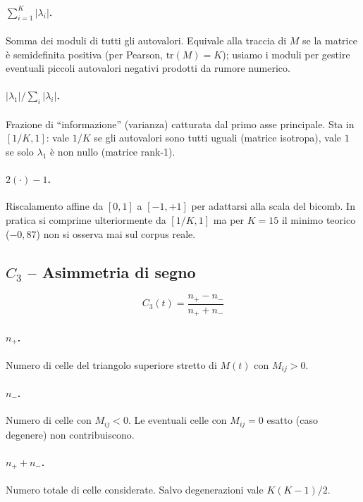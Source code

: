 \documentclass[a4paper,11pt]{article}
\begin{document}
\paragraph{$\sum_{i=1}^{K} |\lambda_i|$.} Somma dei moduli di tutti gli
autovalori. Equivale alla traccia di $M$ se la matrice è
semidefinita positiva (per Pearson, $\mathrm{tr}(M) = K$); usiamo i
moduli per gestire eventuali piccoli autovalori negativi prodotti da
rumore numerico.

\paragraph{$|\lambda_1| / \sum_i |\lambda_i|$.} Frazione di
``informazione'' (varianza) catturata dal primo asse principale. Sta in
$[1/K, 1]$: vale $1/K$ se gli autovalori sono tutti uguali (matrice
isotropa), vale $1$ se solo $\lambda_1$ è non nullo (matrice rank-1).

\paragraph{$2(\cdot) - 1$.} Riscalamento affine da $[0, 1]$ a $[-1, +1]$
per adattarsi alla scala del bicomb. In pratica si comprime ulteriormente
da $[1/K, 1]$ ma per $K = 15$ il minimo teorico ($-0{,}87$) non si
osserva mai sul corpus reale.

\subsection{$C_3$ -- Asimmetria di segno}

\[
C_3(t) = \frac{n_+ - n_-}{n_+ + n_-}
\]

\paragraph{$n_+$.} Numero di celle del triangolo superiore stretto di
$M(t)$ con $M_{ij} > 0$.

\paragraph{$n_-$.} Numero di celle con $M_{ij} < 0$. Le eventuali celle
con $M_{ij} = 0$ esatto (caso degenere) non contribuiscono.

\paragraph{$n_+ + n_-$.} Numero totale di celle considerate. Salvo
degenerazioni vale $K(K-1)/2$.
\end{document}
